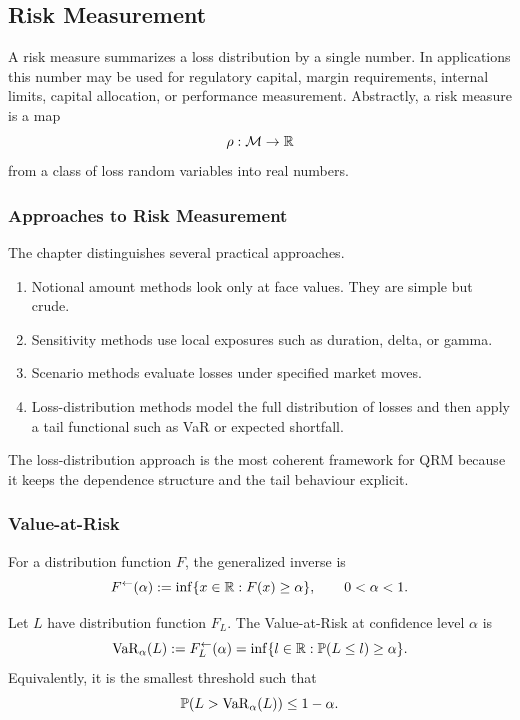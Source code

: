 \subsection{Risk Measurement}

A risk measure summarizes a loss distribution by a single number. In applications this number may be used for regulatory capital, margin requirements, internal limits, capital allocation, or performance measurement. Abstractly, a risk measure is a map
\[
    \rho:\mathcal{M}\to\mathbb{R}
\]
from a class of loss random variables into real numbers.

\subsubsection{Approaches to Risk Measurement}

The chapter distinguishes several practical approaches.

\begin{enumerate}
    \item Notional amount methods look only at face values. They are simple but crude.
    \item Sensitivity methods use local exposures such as duration, delta, or gamma.
    \item Scenario methods evaluate losses under specified market moves.
    \item Loss-distribution methods model the full distribution of losses and then apply a tail functional such as VaR or expected shortfall.
\end{enumerate}

The loss-distribution approach is the most coherent framework for QRM because it keeps the dependence structure and the tail behaviour explicit.

\subsubsection{Value-at-Risk}

\begin{definition}
For a distribution function $F$, the generalized inverse is
\[
    F^{\leftarrow}(\alpha):=\inf\{x\in\mathbb{R}:F(x)\ge \alpha\},
    \qquad 0<\alpha<1.
\]
\end{definition}

\begin{definition}
Let $L$ have distribution function $F_L$. The Value-at-Risk at confidence level $\alpha$ is
\[
    \operatorname{VaR}_\alpha(L):=F_L^{\leftarrow}(\alpha)
    =\inf\{l\in\mathbb{R}:\mathbb{P}(L\le l)\ge \alpha\}.
\]
Equivalently, it is the smallest threshold such that
\[
    \mathbb{P}(L>\operatorname{VaR}_\alpha(L))\le 1-\alpha.
\]
\end{definition}

